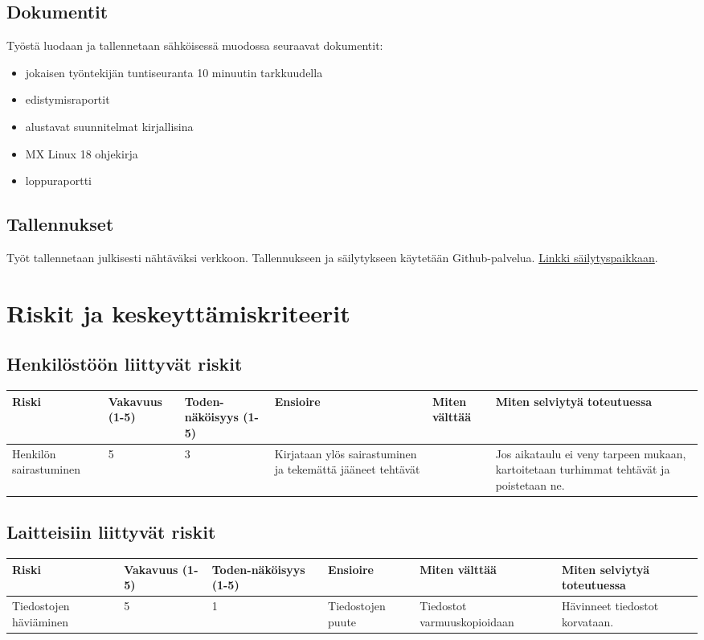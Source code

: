 \documentclass[a4paper, 12pt, finnish]{article}
\begin{document}
\subsection{Dokumentit}

Työstä luodaan ja tallennetaan sähköisessä muodossa seuraavat dokumentit:
\begin{itemize}
    \item jokaisen työntekijän tuntiseuranta 10 minuutin tarkkuudella
    \item edistymisraportit
    \item alustavat suunnitelmat kirjallisina
    \item MX Linux 18 ohjekirja
    \item loppuraportti
\end{itemize}

\subsection{Tallennukset}

Työt tallennetaan julkisesti nähtäväksi verkkoon. Tallennukseen ja säilytykseen käytetään Github-palvelua. \href{http://github.com/maysion/mxlinux18}{Linkki säilytyspaikkaan}. 

\section{Riskit ja keskeyttämiskriteerit}
\subsection{Henkilöstöön liittyvät riskit}
\begin{table}[!htpb]
\begin{tabularx}{1.1\textwidth}{|X|X|X|X|X|X|}
\hline
\rowcolor[HTML]{EFEFEF} 
\textbf{Riski} & \textbf{Vakavuus (1-5)} & \textbf{Toden-näköisyys (1-5)} & \textbf{Ensioire} & \textbf{Miten välttää} & \textbf{Miten selviytyä toteutuessa} \\ \hline
Henkilön sairastuminen & 5 & 3 & Kirjataan ylös sairastuminen ja tekemättä jääneet tehtävät &  & Jos aikataulu ei veny tarpeen mukaan, kartoitetaan turhimmat tehtävät ja poistetaan ne. \\ \hline
\end{tabularx}
\end{table}
\clearpage
\subsection{Laitteisiin liittyvät riskit}
\begin{table}[!htpb]
\begin{tabularx}{1.1\textwidth}{|X|X|X|X|X|X|}
\hline
\rowcolor[HTML]{EFEFEF} 
\textbf{Riski} & \textbf{Vakavuus (1-5)} & \textbf{Toden-näköisyys (1-5)} & \textbf{Ensioire} & \textbf{Miten välttää} & \textbf{Miten selviytyä toteutuessa} \\ \hline
Tiedostojen häviäminen & 5 & 1 & Tiedostojen puute & Tiedostot varmuuskopioidaan & Hävinneet tiedostot korvataan. \\ \hline
\end{tabularx}
\end{table}
\end{document}
